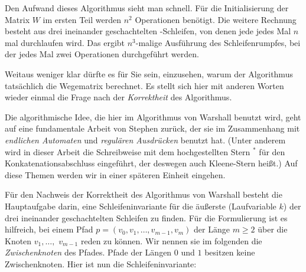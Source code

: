 Den Aufwand dieses Algorithmus sieht man schnell. Für die
Initialisierung der Matrix $W$ im ersten Teil werden $n^2$ Operationen
benötigt. Die weitere Rechnung besteht aus drei ineinander
geschachtelten -Schleifen, von denen jede jedes Mal $n$ mal
durchlaufen wird. Das ergibt $n^3$-malige Ausführung des
Schleifenrumpfes, bei der jedes Mal zwei Operationen durchgeführt
werden.

Weitaus weniger klar dürfte es für Sie sein, einzusehen, warum der
Algorithmus tatsächlich die Wegematrix berechnet. Es stellt sich hier
mit anderen Worten wieder einmal die Frage nach der \emph{Korrektheit}
des Algorithmus. 

Die algorithmische Idee, die hier im Algorithmus von Warshall benutzt
wird, geht auf eine fundamentale Arbeit von Stephen
\textcite{Kleene_1956_REN_ic} zurück, der
sie im Zusammenhang mit \emph{endlichen Automaten} und \emph{regulären
  Ausdrücken} benutzt hat. (Unter anderem wird in dieser Arbeit die
Schreibweise mit dem hochgestellten Stern $^*$ für den
Konkatenationsabschluss eingeführt, der deswegen auch Kleene-Stern
heißt.) Auf diese Themen werden wir in einer späteren Einheit
eingehen.

Für den Nachweis der Korrektheit des Algorithmus von War\-shall
besteht die Hauptaufgabe darin, eine Schleifeninvariante für die
äußerste (Laufvariable $k$) der drei ineinander geschachtelten
Schleifen
% 
zu finden. Für die Formulierung ist es hilfreich, bei einem Pfad
$p=(v_0, v_1, \dots, v_{m-1}, v_m)$ der Länge $m\geq 2$ über die
Knoten $v_1, \dots,$ $v_{m-1}$ reden zu können. Wir nennen sie im
folgenden die \emph{Zwischenknoten} des Pfades. Pfade der Längen $0$
und $1$ besitzen keine Zwischenknoten. Hier ist nun die
Schleifeninvariante:

